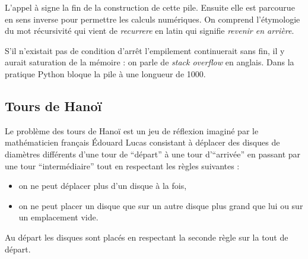 L'appel à  signe la fin de la construction de cette pile. Ensuite  elle est parcourue en sens inverse pour permettre les calculs numériques. On comprend l’étymologie du mot récursivité qui vient de {\it recurrere} en latin qui signifie {\it revenir en arrière}.

S'il n'existait pas de condition d'arrêt l'empilement continuerait sans fin, il y aurait saturation de la mémoire : on parle de {\it stack overflow} en anglais. Dans la pratique Python bloque la pile à une longueur de 1000.
\subsection{Tours de Hanoï}
Le problème des tours de Hanoï est un jeu de réflexion imaginé par le mathématicien français Édouard Lucas consistant à déplacer des disques de diamètres différents d'une tour de ``départ'' à  une tour d'``arrivée'' en passant par une tour ``intermédiaire'' tout en respectant les règles suivantes :
\begin{itemize}
\item on ne peut déplacer plus d'un disque à la fois,
\item on ne peut placer un disque que sur un autre disque plus grand que lui ou sur un emplacement vide.
\end{itemize}
Au départ les disques sont placés en respectant la seconde règle sur la tout de départ.

